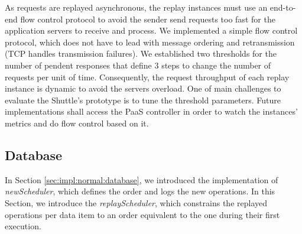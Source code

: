 



As requests are replayed asynchronous, the replay instances must use an end-to-end flow control protocol to avoid the sender send requests too fast for the application servers to receive and process. We implemented a simple flow control protocol, which does not have to lead with message ordering and retransmission (\ac{TCP} handles transmission failures). We established two thresholds for the number of pendent responses that define 3 steps to change the number of requests per unit of time. Consequently, the request throughput of each replay instance is dynamic to avoid the servers overload. One of main challenges to evaluate the Shuttle's prototype is to tune the threshold parameters. Future implementations shall access the \ac{PaaS} controller in order to watch the instances' metrics and do flow control based on it.\\


\subsection{Database}\label{sec:impl:recovery:database}
In Section \ref{sec:impl:normal:database}, we introduced the implementation of \emph{newScheduler}, which defines the order and logs the new operations. In this Section, we introduce the \emph{replayScheduler}, which constrains the replayed operations per data item to an order equivalent to the one during their first execution.


